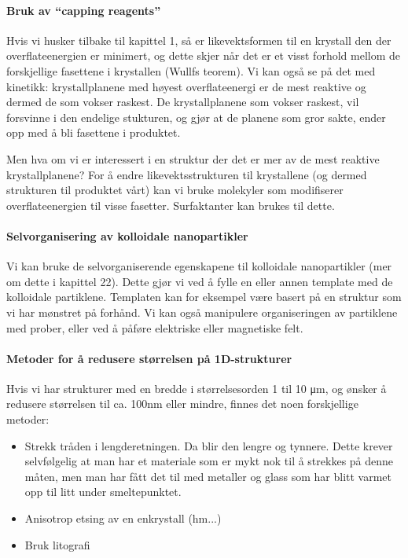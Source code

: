 \paragraph{Bruk av ``capping reagents''} Hvis vi husker tilbake til kapittel 1, så er likevektsformen til en krystall den der overflateenergien er minimert, og dette skjer når det er et visst forhold mellom de forskjellige fasettene i krystallen (Wullfs teorem). Vi kan også se på det med kinetikk: krystallplanene med høyest overflateenergi er de mest reaktive og dermed de som vokser raskest. De krystallplanene som vokser raskest, vil forsvinne i den endelige stukturen, og gjør at de planene som gror sakte, ender opp med å bli fasettene i produktet.

Men hva om vi er interessert i en struktur der det er mer av de mest reaktive krystallplanene? For å endre likevektsstrukturen til krystallene (og dermed strukturen til produktet vårt) kan vi bruke molekyler som modifiserer overflateenergien til visse fasetter. Surfaktanter kan brukes til dette.

\paragraph{Selvorganisering av kolloidale nanopartikler} Vi kan bruke de selvorganiserende egenskapene til kolloidale nanopartikler (mer om dette i kapittel 22). Dette gjør vi ved å fylle en eller annen template med de kolloidale partiklene. Templaten kan for eksempel være basert på en struktur som vi har mønstret på forhånd. Vi kan også manipulere organiseringen av partiklene med prober, eller ved å påføre elektriske eller magnetiske felt.

\paragraph{Metoder for å redusere størrelsen på 1D-strukturer} Hvis vi har strukturer med en bredde i størrelsesorden 1 til 10 \si{\micro\meter}, og ønsker å redusere størrelsen til ca. 100\si{\nano\meter} eller mindre, finnes det noen forskjellige metoder:
\begin{itemize}
	\item Strekk tråden i lengderetningen. Da blir den lengre og tynnere. Dette krever selvfølgelig at man har et materiale som er mykt nok til å strekkes på denne måten, men man har fått det til med metaller og glass som har blitt varmet opp til litt under smeltepunktet.
	\item Anisotrop etsing av en enkrystall (hm...)
	\item Bruk litografi
\end{itemize}

